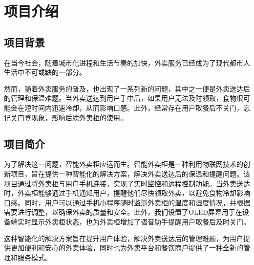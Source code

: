 \documentclass[12pt,hyperref,a4paper,UTF8]{ctexart}
\begin{document}
\cover

%
%

\thispagestyle{empty} %

\newpage
\tableofcontents

\newpage


\section{项目介绍}



\subsection*{项目背景}
在当今社会，随着城市化进程和生活节奏的加快，外卖服务已经成为了现代都市人生活中不可或缺的一部分。

然而，随着外卖服务的普及，也出现了一系列新的问题，其中之一便是外卖送达后的管理和保温难题。当外卖送达到用户手中后，如果用户无法及时领取，食物很可能会在短时间内迅速冷却，从而影响口感。此外，经常存在用户取餐后不关门，忘记关门登现象，影响后续外卖柜的使用。


\subsection*{项目简介}
为了解决这一问题，智能外卖柜应运而生。智能外卖柜是一种利用物联网技术的创新项目，旨在提供一种智能化的解决方案，解决外卖送达后的保温和提醒问题。该项目通过将外卖柜与用户手机连接，实现了实时监控和远程控制功能。当外卖送达时，外卖柜能够通过手机通知用户，提醒他们尽快领取外卖，以避免食物冷却影响口感。同时，用户可以通过手机小程序随时监测外卖柜的温度和湿度情况，并根据需要进行调整，以确保外卖的质量和安全。此外，我们设置了OLED屏幕用于在设备端实时显示外卖柜状态，也为外卖柜增加了语音助手提醒用户取餐后及时关门。

这种智能化的解决方案旨在提升用户体验，解决外卖送达后的管理难题，为用户提供更加便利和安心的外卖体验，同时也为外卖平台和餐饮商户提供了一种全新的管理和服务模式。
\end{document}
